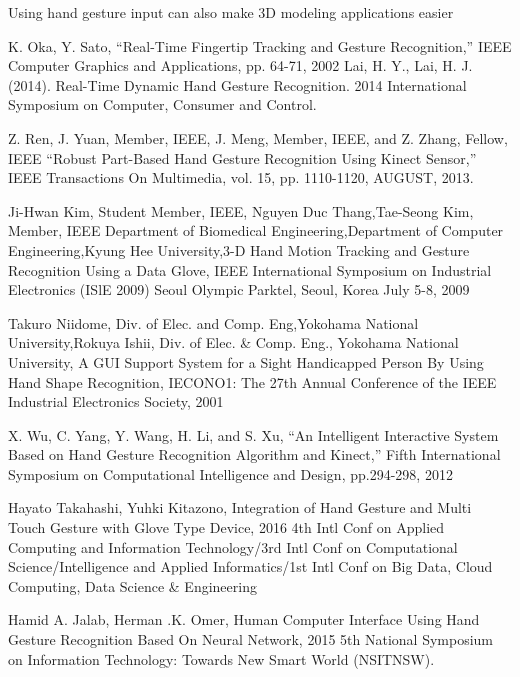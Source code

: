 \documentclass[11pt]{report}
\begin{document}
Using hand gesture input can also make 3D modeling applications easier

   
\begin{thebibliography}{999}

    \bibitem{} K. Oka, Y. Sato, “Real-Time Fingertip Tracking and Gesture Recognition,” IEEE Computer Graphics and Applications, pp. 64-71, 2002
    \bibitem{} Lai, H. Y., Lai, H. J. (2014). Real-Time Dynamic Hand Gesture Recognition. 2014 International Symposium on Computer, Consumer and Control. 
    
    \bibitem{} Z. Ren, J. Yuan, Member, IEEE, J. Meng, Member, IEEE, and Z. Zhang, Fellow, IEEE “Robust Part-Based Hand Gesture Recognition Using Kinect Sensor,” IEEE Transactions On Multimedia, vol. 15, pp. 1110-1120, AUGUST, 2013.
    
    \bibitem{} Ji-Hwan Kim, Student Member, IEEE, Nguyen Duc Thang,Tae-Seong Kim, Member, IEEE Department of Biomedical Engineering,Department of Computer Engineering,Kyung Hee University,3-D Hand Motion Tracking and Gesture Recognition
    Using a Data Glove, IEEE International Symposium on Industrial Electronics (ISlE 2009) Seoul Olympic Parktel, Seoul, Korea July 5-8, 2009
    
    \bibitem{} Takuro Niidome, Div. of Elec. and Comp. Eng,Yokohama National University,Rokuya Ishii, Div. of Elec. \& Comp. Eng., Yokohama National University, A GUI Support System for a Sight Handicapped Person By Using Hand Shape Recognition, IECONO1: The 27th Annual Conference of the IEEE Industrial Electronics Society, 2001
    
    \bibitem{} X. Wu, C. Yang, Y. Wang, H. Li, and S. Xu, “An Intelligent Interactive System Based on Hand Gesture Recognition Algorithm and Kinect,” Fifth International Symposium on Computational Intelligence and Design, pp.294-298, 2012
    
    \bibitem{} Hayato Takahashi, Yuhki Kitazono, Integration of Hand Gesture and Multi Touch Gesture with Glove Type Device, 2016 4th Intl Conf on Applied Computing and Information Technology/3rd Intl Conf on Computational Science/Intelligence and Applied Informatics/1st Intl Conf on Big Data, Cloud Computing, Data Science \& Engineering
    
    \bibitem{} Hamid A. Jalab, Herman .K. Omer, Human Computer Interface Using Hand Gesture Recognition Based On Neural Network, 2015 5th National Symposium on Information Technology: Towards New Smart World (NSITNSW).
    

\end{thebibliography}
\end{document}

